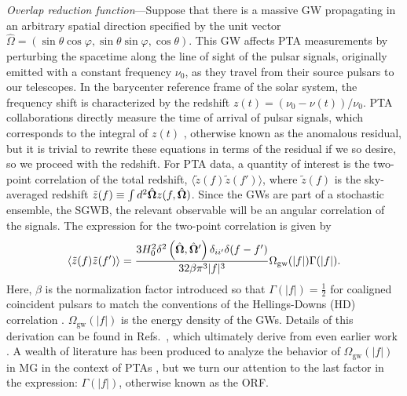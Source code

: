 \documentclass[10pt,prd,twocolumn,aps,nofootinbib,nobibnotes,superscriptaddress,preprintnumbers]{revtex4-2}
\begin{document}
\textit{Overlap reduction function}---Suppose that there is a massive GW propagating in an arbitrary spatial direction specified by the unit vector $\hat{\Omega} = (\sin\theta \cos\varphi,
                        \sin\theta \sin\varphi,
                        \cos\theta)$.
This GW affects PTA measurements by perturbing the spacetime along the line of sight of the pulsar signals, originally emitted with a constant frequency $\nu_0$, as they travel from their source pulsars to our telescopes. In the barycenter reference frame of the solar system, the frequency shift is characterized by the redshift $z(t) = (\nu_0 - \nu(t))/\nu_0$. PTA collaborations directly measure the time of arrival of pulsar signals, which corresponds to the integral of $z(t)$ \cite{Anholm:2008wy, Dahal:2020}, otherwise known as the anomalous residual, but it is trivial to rewrite these equations in terms of the residual if we so desire, so we proceed with the redshift. For PTA data, a quantity of interest is the two-point correlation of the total redshift, $\langle \tilde{z}(f) \tilde{z}(f') \rangle$, where $\tilde{z}(f)$ is the sky-averaged redshift $\tilde{z}(f) \equiv \int d^2\hat{\bf \Omega} z(f, \hat{\bf \Omega})$. Since the GWs are part of a stochastic ensemble, the SGWB, the relevant observable will be an angular correlation of the signals. The expression for the two-point correlation is given by \cite{Liang:2021bct, Anholm:2008wy}
\begin{equation}\label{eqn:two_point_z}
    \langle \tilde{z}(f) \tilde{z}(f') \rangle = \frac{3H_0^2\delta^2\left(\hat{\bf \Omega} , \hat{\bf \Omega}'\right)\delta_{ii'}\delta(f - f')}{32 \beta \pi^3|f|^3}\Omega_{\text{gw}}(|f|) \Gamma(|f|).
\end{equation}
Here, $\beta$ is the normalization factor introduced so that $\Gamma(|f|) = \frac{1}{2}$ for coaligned coincident pulsars to match the conventions of the Hellings-Downs (HD) correlation \cite{Romano:2023zhb}. $\Omega_{\text{gw}}(|f|)$ is the energy density of the GWs. Details of this derivation can be found in Refs.~\cite{Anholm:2008wy, Liang:2021bct}, which ultimately derive from even earlier work \cite{Detweiler:1979wn, Estabrook:1975jtn, Kaufmann:1970}. A wealth of literature has been produced to analyze the behavior of $\Omega_{\text{gw}}(|f|)$ in MG in the context of PTAs \cite{Choi:2023tun, Wu:2023rib, Kenjale:2024rsc, He:2021bqm}, but we turn our attention to the last factor in the expression: $\Gamma(|f|)$, otherwise known as the ORF. 
\end{document}
